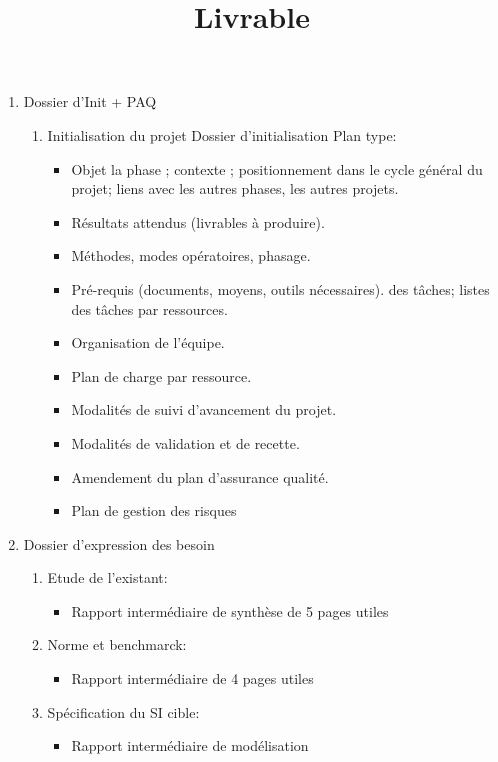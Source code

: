 \documentclass [12pt,a4paper,twoside]{article}
\begin{document}
\title{Livrable}
\begin{enumerate}
	\item Dossier d'Init + PAQ
		\begin{enumerate}
			\item Initialisation du projet
				Dossier d'initialisation
					Plan type:
						\begin{itemize}
							\item Objet la phase ; contexte ; positionnement dans le cycle général du projet; liens avec les autres phases, les autres projets.
							\item Résultats attendus (livrables à produire).
							\item Méthodes, modes opératoires, phasage.
							\item Pré-requis (documents, moyens, outils nécessaires).
							\itemPlanning des tâches; listes des tâches par ressources.
							\item Organisation de l’équipe.
							\item Plan de charge par ressource.
							\item Modalités de suivi d’avancement du projet.
							\item Modalités de validation et de recette.
							\item Amendement du plan d’assurance qualité.
							\item Plan de gestion des risques
						\end{itemize}
		\end{enumerate}
	\item Dossier d'expression des besoin
		\begin{enumerate}
			\item Etude de l'existant:
				\begin{itemize}
					\item Rapport intermédiaire de synthèse de 5 pages utiles
				\end{itemize}
			\item Norme et benchmarck:
				\begin{itemize} 
					\item Rapport intermédiaire de 4 pages utiles
				\end{itemize}
			\item Spécification du SI cible:
				\begin{itemize} 
					\item Rapport intermédiaire de modélisation
				\end{itemize}
		\end{enumerate}


\end{enumerate}
\end{document}
